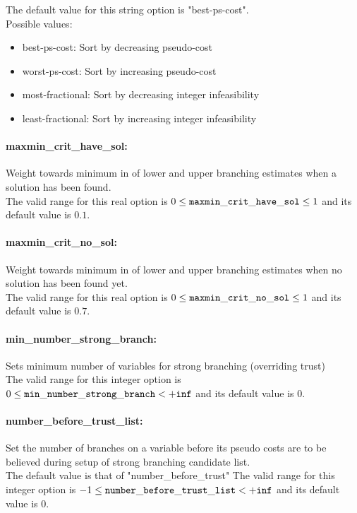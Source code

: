 The default value for this string option is "best-ps-cost".
\\ 
Possible values:
\begin{itemize}
   \item best-ps-cost: Sort by decreasing pseudo-cost
   \item worst-ps-cost: Sort by increasing pseudo-cost
   \item most-fractional: Sort by decreasing integer infeasibility
   \item least-fractional: Sort by increasing integer infeasibility
\end{itemize}

\paragraph{maxmin\_crit\_have\_sol:}\label{sec:maxmin_crit_have_sol} Weight towards minimum in of lower and upper branching estimates when a solution has been found. $\;$ \\
 The valid range for this real option is 
$0 \le {\tt maxmin\_crit\_have\_sol } \le 1$
and its default value is $0.1$.


\paragraph{maxmin\_crit\_no\_sol:}\label{sec:maxmin_crit_no_sol} Weight towards minimum in of lower and upper branching estimates when no solution has been found yet. $\;$ \\
 The valid range for this real option is 
$0 \le {\tt maxmin\_crit\_no\_sol } \le 1$
and its default value is $0.7$.


\paragraph{min\_number\_strong\_branch:}\label{sec:min_number_strong_branch} Sets minimum number of variables for strong branching (overriding trust) $\;$ \\
 The valid range for this integer option is
$0 \le {\tt min\_number\_strong\_branch } <  {\tt +inf}$
and its default value is $0$.


\paragraph{number\_before\_trust\_list:}\label{sec:number_before_trust_list} Set the number of branches on a variable before its pseudo costs are to be believed during setup of strong branching candidate list. $\;$ \\
 The default value is that of
"number\_before\_trust" The valid range for this integer option is
$-1 \le {\tt number\_before\_trust\_list } <  {\tt +inf}$
and its default value is $0$.



